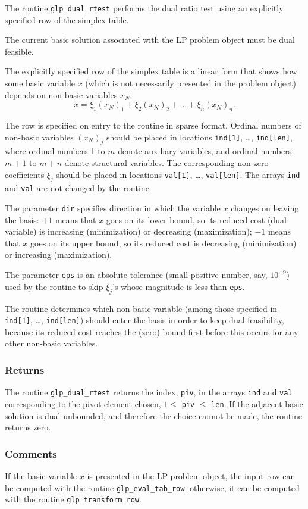 The routine \verb|glp_dual_rtest| performs the dual ratio test using
an explicitly specified row of the simplex table.

The current basic solution associated with the LP problem object must be
dual feasible.

The explicitly specified row of the simplex table is a linear form
that shows how some basic variable $x$ (which is not necessarily
presented in the problem object) depends on non-basic variables $x_N$:
$$x=\xi_1(x_N)_1+\xi_2(x_N)_2+\dots+\xi_n(x_N)_n.$$

The row is specified on entry to the routine in sparse format. Ordinal
numbers of non-basic variables $(x_N)_j$ should be placed in locations
\verb|ind[1]|, \dots, \verb|ind[len]|, where ordinal numbers 1 to $m$
denote auxiliary variables, and ordinal numbers $m+1$ to $m+n$ denote
structural variables. The corresponding non-zero coefficients $\xi_j$
should be placed in locations \verb|val[1]|, \dots, \verb|val[len]|.
The arrays \verb|ind| and \verb|val| are not changed by the routine.

The parameter \verb|dir| specifies direction in which the variable $x$
changes on leaving the basis: $+1$ means that $x$ goes on its lower
bound, so its reduced cost (dual variable) is increasing (minimization)
or decreasing (maximization); $-1$ means that $x$ goes on its upper
bound, so its reduced cost is decreasing (minimization) or increasing
(maximization).

The parameter \verb|eps| is an absolute tolerance (small positive
number, say, $10^{-9}$) used by the routine to skip $\xi_j$'s whose
magnitude is less than \verb|eps|.

The routine determines which non-basic variable (among those specified
in \verb|ind[1]|, \dots, \verb|ind[len]|) should enter the basis in
order to keep dual feasibility, because its reduced cost reaches the
(zero) bound first before this occurs for any other non-basic variables.

\subsubsection*{Returns}

The routine \verb|glp_dual_rtest| returns the index, \verb|piv|, in the
arrays \verb|ind| and \verb|val| corresponding to the pivot element
chosen, $1\leq$ \verb|piv| $\leq$ \verb|len|. If the adjacent basic
solution is dual unbounded, and therefore the choice cannot be made,
the routine returns zero.

\subsubsection*{Comments}

If the basic variable $x$ is presented in the LP problem object, the
input row can be computed with the routine \verb|glp_eval_tab_row|;
otherwise, it can be computed with the routine \verb|glp_transform_row|.

